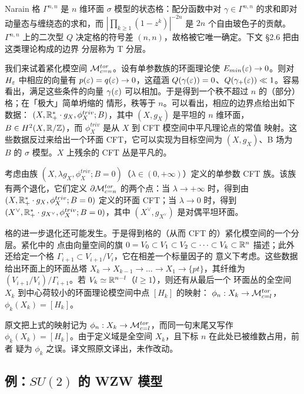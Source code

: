 \begin{yizhu}[Narain 格]
Narain 格 $\Gamma^{n,n}$ 是 $n$ 维环面 $\sigma$ 模型的状态格：配分函数中对
$\gamma\in\Gamma^{n,n}$ 的求和即对动量态与缠绕态的求和，而
$|\prod_{k\ge1}(1-z^k)|^{-2n}$ 是 $2n$ 个自由玻色子的贡献。$\Gamma^{n,n}$ 上的二次型
$Q$ 决定格的符号差 $(n,n)$，故格被它唯一确定。下文 \S2.6 把由这类理论构成的边界
分层称为 T 分层。
\end{yizhu}

我们来试着紧化模空间 $\mathcal{M}^{tor}_{c=n}$。设有单参数族的环面理论使
$E_{min}(\varepsilon)\to0$。则对 $H_{\varepsilon}$ 中相应的向量有 $p(\varepsilon)=q(\varepsilon)\to0$，这蕴涵
$Q(\gamma(\varepsilon))=0$、$Q(\gamma_+(\varepsilon))\ll1$。容易看出，满足这些条件的向量
$\gamma(\varepsilon)$ 可以相加。于是得到一个秩不超过 $n$ 的（部分）格；在「极大」简单坍缩的
情形，秩等于 $n$。可以看出，相应的边界点给出如下数据：
$(X,\mathbb{R}^*_+\cdot g_X,\phi_X^{triv};B)$，其中 $(X,g_X)$ 是平坦的 $n$ 维环面，
$B\in H^2(X,\mathbb{R}/\mathbb{Z})$，而 $\phi_X^{triv}$ 是从 $X$ 到 CFT 模空间中平凡理论点的常值
映射。这些数据反过来给出一个环面 CFT，它可以实现为目标空间为 $(X,g_X)$、B 场为 $B$
的 $\sigma$ 模型。$X$ 上残余的 CFT 丛是平凡的。

考虑由族 $(X,\lambda g_X,\phi_X^{triv};B=0)$（$\lambda\in(0,+\infty)$）定义的单参数
CFT 族。该族有两个退化，它们定义 $\partial\mathcal{M}^{tor}_{c=n}$ 的两个点：当
$\lambda\to+\infty$ 时，得到由 $(X,\mathbb{R}^*_+\cdot g_X,\phi_X^{triv};B=0)$ 定义的环面
CFT；当 $\lambda\to0$ 时，得到 $(X^{\vee},\mathbb{R}^*_+\cdot g_{X^{\vee}},
\phi_X^{triv};B=0)$，其中 $(X^{\vee},g_{X^{\vee}})$ 是对偶平坦环面。

格的进一步退化还可能发生。于是得到格的（从而 CFT 的）紧化模空间的一个分层。紧化中的
点由向量空间的旗 $0=V_0\subset V_1\subset V_2\subset\dots\subset V_k\subset\mathbb{R}^n$
描述；此外还给定一个格 $\Gamma_{i+1}\subset V_{i+1}/V_i$，它在相差一个标量因子的
意义下考虑。这些数据给出环面上的环面丛塔
$X_k\to X_{k-1}\to\dots\to X_1\to\{pt\}$，其纤维为
$(V_{i+1}/V_i)/\Gamma_{i+1}$。若 $V_k\simeq\mathbb{R}^{n-l}$（$l\ge1$），则还有从最后一个
环面丛的全空间 $X_k$ 到中心荷较小的环面理论模空间中点 $[H_k]$ 的映射：
$\phi_n:X_k\to\mathcal{M}^{tor}_{c=l}$，$\phi_k(X_k)=[H_k]$。

\begin{yizhu}[原文的一处笔误]
原文把上式的映射记为 $\phi_n:X_k\to\mathcal{M}^{tor}_{c=l}$，而同一句末尾又写作
$\phi_k(X_k)=[H_k]$。由于定义域是全空间 $X_k$，且下标 $n$ 在此处已被维数占用，前者
疑为 $\phi_k$ 之误。译文照原文译出，未作改动。
\end{yizhu}

\subsection{例：$SU(2)$ 的 WZW 模型}

